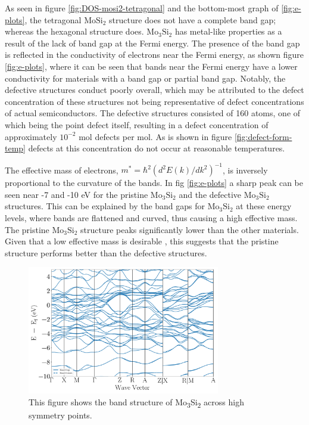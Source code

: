 \documentclass[12pt]{article}
\theoremstyle{plain}
\theoremstyle{definition}
\newcommand{\<}{\langle}
\renewcommand{\>}{\rangle}
\begin{document}
As seen in figure \ref{fig:DOS-mosi2-tetragonal} and the bottom-most graph of \ref{fig:e-plots}, the tetragonal $\text{Mo}\text{Si}_2$ structure does not have a complete band gap; whereas the hexagonal structure does. $\text{Mo}_3\text{Si}_2$ has metal-like properties as a result of the lack of band gap at the Fermi energy. 
The presence of the band gap is reflected in the conductivity of electrons near the Fermi energy, as shown figure \ref{fig:e-plots}, where it can be seen that bands near the Fermi energy have a lower conductivity for materials with a band gap or partial band gap. 
Notably, the defective structures conduct poorly overall, which may be attributed to the defect concentration of these structures not being representative of defect concentrations of actual semiconductors. 
The defective structures consisted of 160 atoms, one of which being the point defect itself, resulting in a defect concentration of approximately $10^{-2}$ mol defects per mol. 
As is shown in figure \ref{fig:defect-form-temp} defects at this concentration do not occur at reasonable temperatures.

The effective mass of electrons, $m^*=\hbar^2\left(d^2 E(k) / d k^2\right)^{-1}$, is inversely proportional to the curvature of the bands. In fig \ref{fig:e-plots} a sharp peak can be seen near -7 and -10 eV for the pristine $\text{Mo}_3\text{Si}_2$ and the defective $\text{Mo}_3\text{Si}_2$ structures. 
This can be explained by the band gaps for $\text{Mo}_3\text{Si}_2$ at these energy levels, where bands are flattened and curved, thus causing a high effective mass. 
The pristine $\text{Mo}_3\text{Si}_2$ structure peaks significantly lower than the other materials. Given that a low effective mass is desirable \cite{alma9939162912205131}, this suggests that the pristine structure performs better than the defective structures.

\begin{figure}
\label{fig:bs-mo3si2}
\centering
\includegraphics[width=0.75\textwidth]{img/bs_Mo3Si2}
\caption{This figure shows the band structure of Mo\textsubscript{3}Si\textsubscript{2} across high symmetry points.}
\end{figure}
\end{document}
